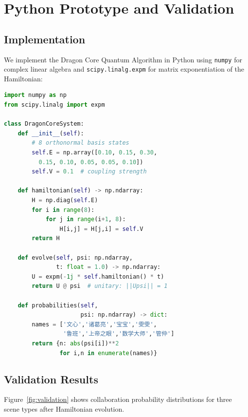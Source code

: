 \documentclass[conference]{IEEEtran}
\begin{document}
\section{Python Prototype and Validation}

\subsection{Implementation}

We implement the Dragon Core Quantum Algorithm in Python
using \texttt{numpy} for complex linear algebra and
\texttt{scipy.linalg.expm} for matrix exponentiation
of the Hamiltonian:

\begin{lstlisting}[language=Python,
  caption={Dragon Core Hamiltonian evolution kernel}]
import numpy as np
from scipy.linalg import expm

class DragonCoreSystem:
    def __init__(self):
        # 8 orthonormal basis states
        self.E = np.array([0.10, 0.15, 0.30,
          0.15, 0.10, 0.05, 0.05, 0.10])
        self.V = 0.1  # coupling strength

    def hamiltonian(self) -> np.ndarray:
        H = np.diag(self.E)
        for i in range(8):
            for j in range(i+1, 8):
                H[i,j] = H[j,i] = self.V
        return H

    def evolve(self, psi: np.ndarray,
               t: float = 1.0) -> np.ndarray:
        U = expm(-1j * self.hamiltonian() * t)
        return U @ psi  # unitary: ||Upsi|| = 1

    def probabilities(self,
                      psi: np.ndarray) -> dict:
        names = ['文心','诸葛亮','宝宝','雯雯',
                 '鲁班','上帝之眼','数学大师','管仲']
        return {n: abs(psi[i])**2
                for i,n in enumerate(names)}
\end{lstlisting}

\subsection{Validation Results}

Figure~\ref{fig:validation} shows collaboration
probability distributions for three scene types
after Hamiltonian evolution.
\end{document}
